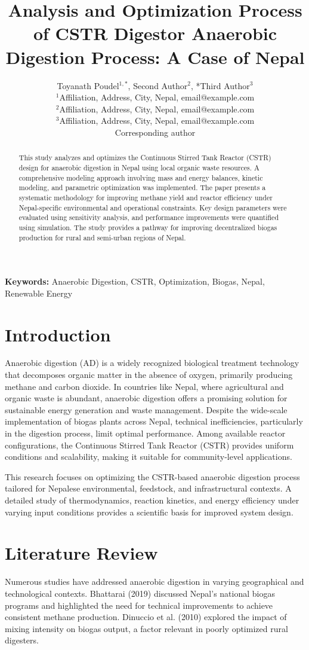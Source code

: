 \documentclass[12pt,a4paper]{article}
\title{Analysis and Optimization Process of CSTR Digestor Anaerobic Digestion Process: A Case of Nepal}
\author{Toyanath Poudel$^{1,*}$, Second Author$^2$, *Third Author$^3$ \\
\small $^1$Affiliation, Address, City, Nepal, email@example.com \\
\small $^2$Affiliation, Address, City, Nepal, email@example.com \\
\small $^3$Affiliation, Address, City, Nepal, email@example.com \\
\small *Corresponding author}
\date{}
\begin{document}
\maketitle

\begin{abstract}
\small
This study analyzes and optimizes the Continuous Stirred Tank Reactor (CSTR) design for anaerobic digestion in Nepal using local organic waste resources. A comprehensive modeling approach involving mass and energy balances, kinetic modeling, and parametric optimization was implemented. The paper presents a systematic methodology for improving methane yield and reactor efficiency under Nepal-specific environmental and operational constraints. Key design parameters were evaluated using sensitivity analysis, and performance improvements were quantified using simulation. The study provides a pathway for improving decentralized biogas production for rural and semi-urban regions of Nepal.
\end{abstract}

\textbf{Keywords:} Anaerobic Digestion, CSTR, Optimization, Biogas, Nepal, Renewable Energy

\section{Introduction}
Anaerobic digestion (AD) is a widely recognized biological treatment technology that decomposes organic matter in the absence of oxygen, primarily producing methane and carbon dioxide. In countries like Nepal, where agricultural and organic waste is abundant, anaerobic digestion offers a promising solution for sustainable energy generation and waste management. Despite the wide-scale implementation of biogas plants across Nepal, technical inefficiencies, particularly in the digestion process, limit optimal performance. Among available reactor configurations, the Continuous Stirred Tank Reactor (CSTR) provides uniform conditions and scalability, making it suitable for community-level applications.

This research focuses on optimizing the CSTR-based anaerobic digestion process tailored for Nepalese environmental, feedstock, and infrastructural contexts. A detailed study of thermodynamics, reaction kinetics, and energy efficiency under varying input conditions provides a scientific basis for improved system design.

\section{Literature Review}
Numerous studies have addressed anaerobic digestion in varying geographical and technological contexts. Bhattarai (2019) discussed Nepal's national biogas programs and highlighted the need for technical improvements to achieve consistent methane production. Dinuccio et al. (2010) explored the impact of mixing intensity on biogas output, a factor relevant in poorly optimized rural digesters.
\end{document}
